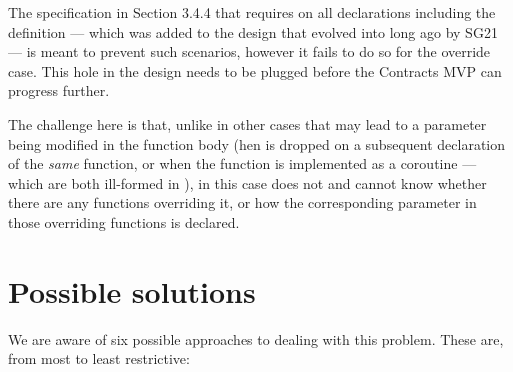 The specification in \cite{P2900R10} Section 3.4.4 that requires  on all declarations including the definition --- which was added to the design that evolved into \cite{P2900R10} long ago by SG21 --- is meant to prevent such scenarios, however it fails to do so for the override case. This hole in the design needs to be plugged before the Contracts MVP can progress further.

The challenge here is that, unlike in other cases that may lead to a  parameter being modified in the function body (hen  is dropped on a subsequent declaration of the \emph{same} function, or when the function is implemented as a coroutine --- which are both ill-formed in \cite{P2900R10}), in this case  does not and cannot know whether there are any functions overriding it, or how the corresponding parameter in those overriding functions is declared.

\section{Possible solutions}

We are aware of six possible approaches to dealing with this problem. These are, from most to least restrictive:

